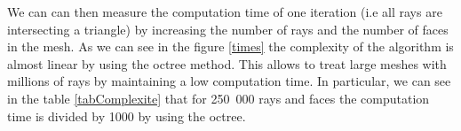 \documentclass[AMA,STIX1COL]{WileyNJD-v2}
\begin{document}

We can can then measure the computation time of one iteration (i.e all rays are intersecting a triangle) by increasing the number of rays and the number of faces in the mesh. As we can see in the figure \ref{times} the complexity of the algorithm is almost linear by using the octree method. This allows to treat large meshes with millions of rays by maintaining a low computation time. In particular, we can see in the table \ref{tabComplexite} that for 250~000 rays and faces the computation time is divided by 1000 by using the octree. 
\end{document}
